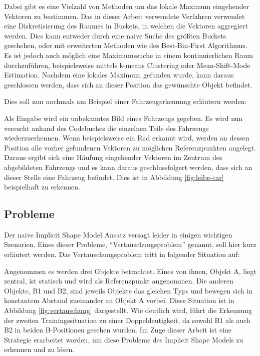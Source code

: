 Dabei gibt es eine Vielzahl von Methoden um das lokale Maximum eingehender Vektoren zu bestimmen.
Das in dieser Arbeit verwendete Verfahren verwendet eine Diskretisierung des Raumes in Buckets, in welchen die Vektoren aggregiert werden.
Dies kann entweder durch eine naive Suche des größten Buckets geschehen, oder mit erweiterten Methoden wie des Best-Bin-First Algorithmus.
Es ist jedoch auch möglich eine Maximumssuche in einem kontinuierlichen Raum durchzuführen, beispielsweise mittels  k-means Clustering oder Mean-Shift-Mode Estimation.
Nachdem eine lokales Maximum gefunden wurde, kann daraus geschlossen werden, dass sich an dieser Position das gewünschte Objekt befindet.

Dies soll nun nochmals am Beispiel einer Fahrzeugerkennung erläutern werden:

Als Eingabe wird ein unbekanntes Bild eines Fahrzeugs gegeben.
Es wird nun versucht anhand des Codebuches die einzelnen Teile des Fahrzeugs wiederzuerkennen.
Wenn beispielsweise ein Rad erkannt wird, werden an dessen Position alle vorher gefundenen Vektoren zu möglichen Referenzpunkten angelegt.
Daraus ergibt sich eine Häufung eingehender Vektoren im Zentrum des abgebildeten Fahrzeugs und es kann daraus geschlussfolgert werden, dass sich an dieser Stelle eine Fahrzeug befindet.
Dies ist in Abbildung \vref{fig:leibe-car} beispielhaft zu erkennen.

\subsection{Probleme}\label{ch:ISM-Probleme}

Der naive Implicit Shape Model Ansatz versagt leider in einigen wichtigen Szenarien.
Eines dieser Probleme, "`Vertauschungsproblem"' genannt, soll hier kurz erläutert werden.
Das Vertauschungsproblem tritt in folgender Situation auf:

Angenommen es werden drei Objekte betrachtet.
Eines von ihnen, Objekt A, liegt zentral, ist statisch und wird als Referenzpunkt angenommen.
Die anderen Objekte, B1 und B2, sind jeweils Objekte das gleichen Typs und bewegen sich in konstantem Abstand zueinander an Objekt A vorbei.
Diese Situation ist in Abbildung \vref{fig:vertauschung} dargestellt.
Wie deutlich wird, führt die Erkennung der zweiten Trainingssituation zu einer Doppeldeutigkeit, da sowohl B1 als auch B2 in beiden B-Positionen gesehen wurden.
Im Zuge dieser Arbeit ist eine Strategie erarbeitet worden, um diese Probleme des Implicit Shape Models zu erkennen und zu lösen.

